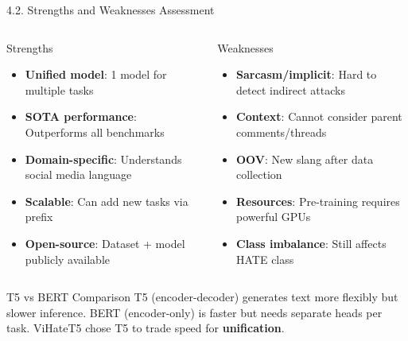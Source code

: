 \documentclass[11pt, aspectratio=169]{beamer}
\begin{document}
\begin{frame}[shrink=5]{4.2. Strengths and Weaknesses Assessment}

\begin{columns}[T]
  \begin{block}{Strengths}
    \begin{itemize}
      \item \textbf{Unified model}: 1 model for multiple tasks
      \item \textbf{SOTA performance}: Outperforms all benchmarks
      \item \textbf{Domain-specific}: Understands social media language
      \item \textbf{Scalable}: Can add new tasks via prefix
      \item \textbf{Open-source}: Dataset + model publicly available
    \end{itemize}
  \end{block}

  \begin{block}{Weaknesses}
    \begin{itemize}
      \item \textbf{Sarcasm/implicit}: Hard to detect indirect attacks
      \item \textbf{Context}: Cannot consider parent comments/threads
      \item \textbf{OOV}: New slang after data collection
      \item \textbf{Resources}: Pre-training requires powerful GPUs
      \item \textbf{Class imbalance}: Still affects HATE class
    \end{itemize}
  \end{block}
\end{columns}

\vspace{0.3cm}
\begin{block}{T5 vs BERT Comparison}
  T5 (encoder-decoder) generates text more flexibly but slower inference. BERT (encoder-only) is faster but needs separate heads per task. ViHateT5 chose T5 to trade speed for \textbf{unification}.
\end{block}
\end{frame}
\end{document}
